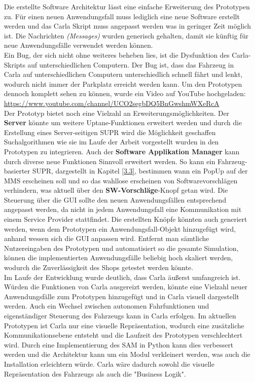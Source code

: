 Die erstellte Software Architektur lässt eine einfache Erweiterung des Prototypen zu. Für einen neuen Anwendungsfall muss lediglich eine neue Software erstellt werden und das Carla Skript muss angepasst werden was in geringer Zeit möglich ist. Die Nachrichten \textit{(Messages)} wurden generisch gehalten, damit sie künftig für neue Anwendungsfälle verwendet werden können.\\

Ein Bug, der sich nicht ohne weiteres beheben lies, ist die Dysfunktion des Carla-Skripts auf unterschiedlichen Computern. Der Bug ist, dass das Fahrzeug in Carla auf unterschiedlichen Computern unterschiedlich schnell fährt und lenkt, wodurch nicht immer der Parkplatz erreicht werden kann. Um den Prototypen dennoch komplett sehen zu können, wurde ein Video auf YouTube hochgeladen: \url{https://www.youtube.com/channel/UCO2segbDQ5BnGwshmWXeRcA}\\

Der Prototyp bietet noch eine Vielzahl an Erweiterungsmöglichkeiten. Der \textbf{Server} könnte um weitere Uptane-Funktionen erweitert werden und durch die Erstellung eines Server-seitigen SUPR wird die Möglichkeit geschaffen Suchalgorithmen wie sie im Laufe der Arbeit vorgestellt wurden in den Prototypen zu integrieren. Auch der \textbf{Software Applikation Manager} kann durch diverse neue Funktionen Sinnvoll erweitert werden. So kann ein Fahrzeug-basierter SUPR, dargestellt in Kapitel \ref{3.3}, bestimmen wann ein PopUp auf der MMS erscheinen soll und so das wahllose erscheinen von Softwarevorschlägen verhindern, was aktuell über den \textbf{SW-Vorschläge}-Knopf getan wird. Die Steuerung über die GUI sollte den neuen Anwendungsfällen entsprechend angepasst werden, da nicht in jedem Anwendungsfall eine Kommunikation mit einem Service Provider stattfindet. Die erstellten Knöpfe könnten auch generiert werden, wenn dem Prototypen ein \glqq Anwendungsfall\grqq-Objekt hinzugefügt wird, anhand wessen sich die GUI anpassen wird.  Entfernt man sämtliche Nutzereingaben des Prototypen und automatisiert so die gesamte Simulation, können die implementierten Anwendungsfälle beliebig hoch skaliert werden, wodurch die Zuverlässigkeit des Shops getestet werden könnte.\\

Im Laufe der Entwicklung wurde deutlich, dass Carla äußerst umfangreich ist. Würden die Funktionen von Carla ausgereizt werden, könnte eine Vielzahl neuer Anwendungsfälle zum Prototypen hinzugefügt und in Carla visuell dargestellt werden. Auch ein Wechsel zwischen autonomen Fahrfunktionen und eigenständiger Steuerung des Fahrzeugs kann in Carla erfolgen. Im aktuellen Prototypen ist Carla nur eine visuelle Repräsentation, wodurch eine zusätzliche Kommunikationsebene entsteht und die Laufzeit des Prototypen verschlechtert wird. Durch eine Implementierung des SAM in Python kann dies verbessert werden und die Architektur kann um ein Modul verkleinert werden, was auch die Installation erleichtern würde. Carla wäre dadurch sowohl die visuelle Repräsentation des Fahrzeugs als auch die "Business Logik".